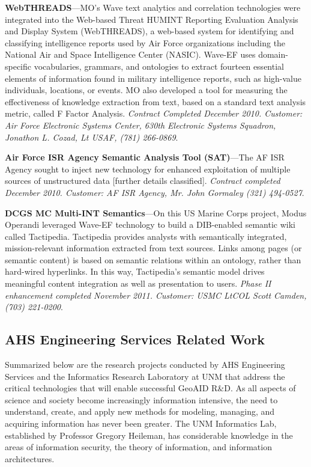 \documentclass{sbir}
\begin{document}
{\bf WebTHREADS}---MO's Wave text analytics and correlation technologies were integrated into the Web-based Threat HUMINT Reporting Evaluation Analysis and Display System (WebTHREADS), a web-based system for identifying and classifying intelligence reports used by Air Force organizations including the National Air and Space Intelligence Center (NASIC). Wave-EF uses domain-specific vocabularies, grammars, and ontologies to extract fourteen essential elements of information found in military intelligence reports, such as high-value individuals, locations, or events. MO also developed a tool for measuring the effectiveness of knowledge extraction from text, based on a standard text analysis metric, called F Factor Analysis. \emph{Contract Completed December 2010. Customer: Air Force Electronic Systems Center, 630th Electronic Systems Squadron, Jonathon L. Cozad,  Lt USAF, (781) 266-0869}.

{\bf Air Force ISR Agency Semantic Analysis Tool (SAT)}---The AF ISR Agency sought to inject new technology for enhanced exploitation of multiple sources of unstructured data [further details classified]. \emph{Contract completed December 2010. Customer: AF ISR Agency, Mr. John Gormaley (321) 494-0527}.

{\bf DCGS MC Multi-INT Semantics}---On this US Marine Corps project, Modus Operandi leveraged Wave-EF technology to build a DIB-enabled semantic wiki called Tactipedia. Tactipedia provides analysts with semantically integrated, mission-relevant information extracted from text sources. Links among pages (or semantic content) is based on semantic relations within an ontology, rather than hard-wired hyperlinks. In this way, Tactipedia's semantic model drives meaningful content integration as well as presentation to users. \emph{Phase II enhancement completed November 2011. Customer: USMC LtCOL Scott Camden, (703) 221-0200}.

\subsection{AHS Engineering Services Related Work}
Summarized below are the research projects conducted by AHS Engineering Services and the Informatics Research Laboratory at UNM that address the critical technologies that will enable successful GeoAID R\&D. As all aspects of science and society become increasingly information intensive, the need to understand, create, and apply new methods for modeling, managing, and acquiring information has never been greater. The UNM Informatics Lab, established by Professor Gregory Heileman, has considerable knowledge in the areas of information security, the theory of information, and information architectures.
\end{document}
